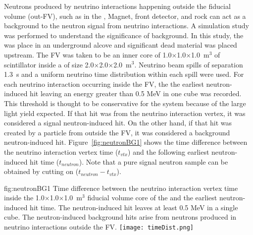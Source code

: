  Neutrons produced by neutrino interactions happening outside the  fiducial volume (out-FV), such as in the , Magnet, front detector, and rock can act as a background to the neutron signal from neutrino interactions. 
A simulation study was performed to understand the significance of background. In this study, the  was place in an underground alcove and significant dead material was placed upstream.  The FV was taken to be an inner core of 1.0$\times$1.0$\times$1.0~m$^{3}$ of scintillator inside a  of size 2.0$\times$2.0$\times$2.0~m$^{3}$.  Neutrino beam spills of separation 1.3~s and a uniform neutrino time distribution within each spill were used.
For each neutrino interaction occurring inside the FV, the 
 the earliest neutron-induced hit leaving an energy greater than 0.5 MeV in one cube was recorded. This threshold is thought to be conservative for the  system because of the large light yield expected.  If that hit was from the neutrino interaction vertex, it was considered a signal neutron-induced hit. On the other hand, if that hit was created by a particle from outside the FV, it was considered a background neutron-induced hit.
Figure~\ref{fig:neutronBG1} shows the time difference between the neutrino interaction vertex time ($t_{vtx}$) and the following earliest neutron-induced hit time ($t_{neutron}$). 
Note that a pure signal neutron sample can be obtained by cutting on ($t_{neutron} - t_{vtx}$). 
\begin{dunefigure}{fig:neutronBG1}
{Time difference between the neutrino interaction vertex time inside the 1.0$\times$1.0$\times$1.0~m$^{3}$ fiducial volume core of the  and the earliest neutron-induced hit time. The neutron-induced hit leaves at least 0.5 MeV in a single cube. The neutron-induced background hits arise from neutrons produced in neutrino interactions outside the FV.}
  \texttt{[image: timeDist.png]}
\end{dunefigure}

